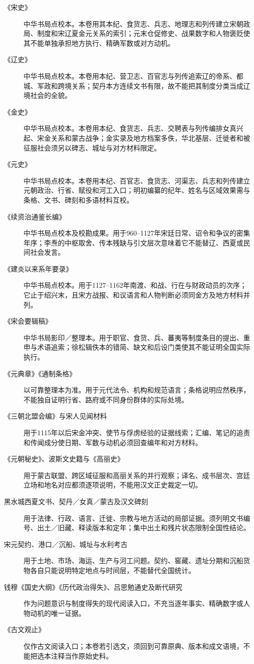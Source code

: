 \begin{description}
\item[《宋史》] 中华书局点校本。本卷用其本纪、食货志、兵志、地理志和列传建立宋朝政局、制度和宋辽夏金元关系的索引；元末仓促修史、战果数字和人物褒贬使其不能单独承担地方执行、精确军数或对方动机。
\item[《辽史》] 中华书局点校本。本卷用本纪、营卫志、百官志与列传追索辽的帝系、都城、军政和跨境关系；契丹本方连续文书有限，故不能把其制度分类当成辽境社会的全貌。
\item[《金史》] 中华书局点校本。本卷用本纪、食货志、兵志、交聘表与列传编排女真兴起、宋金关系和蒙古战争；金实录及地方档案多佚，华北基层、迁徙者和被征服社会须另以碑志、城址与对方材料限定。
\item[《元史》] 中华书局点校本。本卷用本纪、百官志、食货志、河渠志、兵志和列传建立元朝政治、行省、赋役和河工入口；明初编纂的纪年、姓名与区域效果需与条格、文书、碑刻和多语材料互校。
\item[《续资治通鉴长编》] 中华书局点校本及校勘成果。用于960--1127年宋廷日常、诏令和争议的密集年序；李焘的中枢取舍、传本残缺与引文层次意味着它不能替辽、西夏或民间社会发言。
\item[《建炎以来系年要录》] 中华书局点校本。用于1127--1162年南渡、和战、行在与财政动员的次序；它止于绍兴末，且宋方战报、和议语言和人物判断必须同金方及地方材料并列。
\item[《宋会要辑稿》] 中华书局影印／整理本。用于职官、食货、兵、蕃夷等制度条目的提出、重申与术语追索；徐松辑佚本的错简、缺文和后设门类使其不能证明全国实际执行。
\item[《元典章》《通制条格》] 以可靠整理本为准。用于元代法令、机构和规范语言；条格说明应然秩序，不能独自证明行省、路府或不同身份群体的实际处境。
\item[《三朝北盟会编》与宋人见闻材料] 用于1115年以后宋金冲突、使节与俘虏经验的证据线索；汇编、笔记的追责和传闻成分使日期、军数与动机必须回查编年和对方材料。
\item[《元朝秘史》、波斯文史籍与《高丽史》] 用于蒙古联盟、跨区域征服和高丽关系的并行观察；译名、成书层次、宫廷立场和地名对应都须逐项说明，不能用汉文正史裁定一切。
\item[黑水城西夏文书、契丹／女真／蒙古及汉文碑刻] 用于法律、行政、语言、迁徙、宗教与地方活动的局部证据。须列明文书编号、出土／旧藏、释读版本和定年；集中出土和残片状态限制全国性结论。
\item[宋元契约、港口／沉船、城址与水利考古] 用于土地、市场、海运、生产与河工问题。契约、窖藏、遗址分期和沉船货物各自只能说明特定地点与时间层，不能替代全国统计。
\item[钱穆《国史大纲》《历代政治得失》、吕思勉通史及断代研究] 作为问题意识与制度得失的现代阅读入口，不充当逐年事实、精确数字或人物动机的唯一证据。
\item[《古文观止》] 仅作古文阅读入口；本卷若引选文，须回到可靠原典、版本和成文语境，不能把选本注释当作原始史料。
\end{description}

